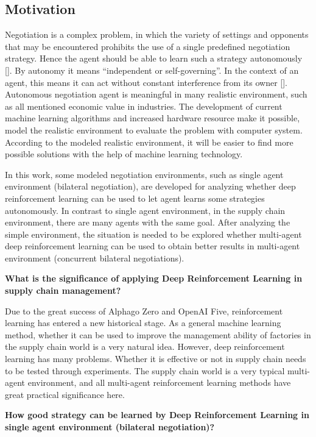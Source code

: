 \subsection{Motivation}
Negotiation is a complex problem, in which the variety of settings and opponents that may be encountered prohibits the use of a single predefined negotiation strategy. Hence the agent should be able to learn such a strategy autonomously []. By autonomy it means “independent or self-governing”. In the context of an agent, this means it can act without constant interference from its owner []. Autonomous negotiation agent is meaningful in many realistic environment, such as all mentioned economic value in industries. The development of current machine learning algorithms and increased hardware resource make it possible, model the realistic environment to evaluate the problem with computer system. According to the modeled realistic environment, it will be easier to find more possible solutions with the help of machine learning technology.

In this work, some modeled negotiation environments, such as single agent environment (bilateral negotiation), are developed for analyzing whether deep reinforcement learning can be used to let agent learns some strategies autonomously. In contrast to single agent environment, in the supply chain environment, there are many agents with the same goal. After analyzing the simple environment, the situation is needed to be explored whether multi-agent deep reinforcement learning can be used to obtain better results in multi-agent environment (concurrent bilateral negotiations).

\textbf{What is the significance of applying Deep Reinforcement Learning in supply chain management?}

Due to the great success of Alphago Zero\parencite{Silver2017} and OpenAI Five\parencite{OpenAI2019}, reinforcement learning has entered a new historical stage. As a general machine learning method, whether it can be used to improve the management ability of factories in the supply chain world is a very natural idea. However, deep reinforcement learning has many problems. Whether it is effective or not in supply chain needs to be tested through experiments. The supply chain world is a very typical multi-agent environment, and all multi-agent reinforcement learning methods have great practical significance here.

\textbf{How good strategy can be learned by Deep Reinforcement Learning in single agent environment (bilateral negotiation)?}

